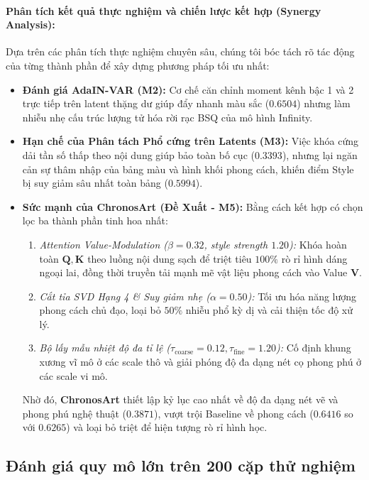 \documentclass[10pt,twocolumn,letterpaper]{article}
\begin{document}
\paragraph{Phân tích kết quả thực nghiệm và chiến lược kết hợp (Synergy Analysis):}
Dựa trên các phân tích thực nghiệm chuyên sâu, chúng tôi bóc tách rõ tác động của từng thành phần để xây dựng phương pháp tối ưu nhất:
\begin{itemize}
    \item \textbf{Đánh giá AdaIN-VAR (M2):} Cơ chế căn chỉnh moment kênh bậc 1 và 2 trực tiếp trên latent thặng dư giúp đẩy nhanh màu sắc ($0.6504$) nhưng làm nhiễu nhẹ cấu trúc lượng tử hóa rời rạc BSQ của mô hình Infinity.
    \item \textbf{Hạn chế của Phân tách Phổ cứng trên Latents (M3):} Việc khóa cứng dải tần số thấp theo nội dung giúp bảo toàn bố cục ($0.3393$), nhưng lại ngăn cản sự thâm nhập của bảng màu và hình khối phong cách, khiến điểm Style bị suy giảm sâu nhất toàn bảng ($0.5994$).
    \item \textbf{Sức mạnh của ChronosArt (Đề Xuất - M5):} Bằng cách kết hợp có chọn lọc ba thành phần tinh hoa nhất:
    \begin{enumerate}
        \item \textit{Attention Value-Modulation ($\beta=0.32$, style strength $1.20$):} Khóa hoàn toàn $\mathbf{Q}, \mathbf{K}$ theo luồng nội dung sạch để triệt tiêu $100\%$ rò rỉ hình dáng ngoại lai, đồng thời truyền tải mạnh mẽ vật liệu phong cách vào Value $\mathbf{V}$.
        \item \textit{Cắt tỉa SVD Hạng 4 \& Suy giảm nhẹ ($\alpha=0.50$):} Tối ưu hóa năng lượng phong cách chủ đạo, loại bỏ $50\%$ nhiễu phổ kỳ dị và cải thiện tốc độ xử lý.
        \item \textit{Bộ lấy mẫu nhiệt độ đa tỉ lệ ($\tau_{\text{coarse}}=0.12, \tau_{\text{fine}}=1.20$):} Cố định khung xương vĩ mô ở các scale thô và giải phóng độ đa dạng nét cọ phong phú ở các scale vi mô.
    \end{enumerate}
    Nhờ đó, \textbf{ChronosArt} thiết lập kỷ lục cao nhất về độ đa dạng nét vẽ và phong phú nghệ thuật ($\mathbf{0.3871}$), vượt trội Baseline về phong cách ($0.6416$ so với $0.6265$) và loại bỏ triệt để hiện tượng rò rỉ hình học.
\end{itemize}

\subsection{Đánh giá quy mô lớn trên 200 cặp thử nghiệm}
\label{subsec:large_benchmark}
\end{document}
